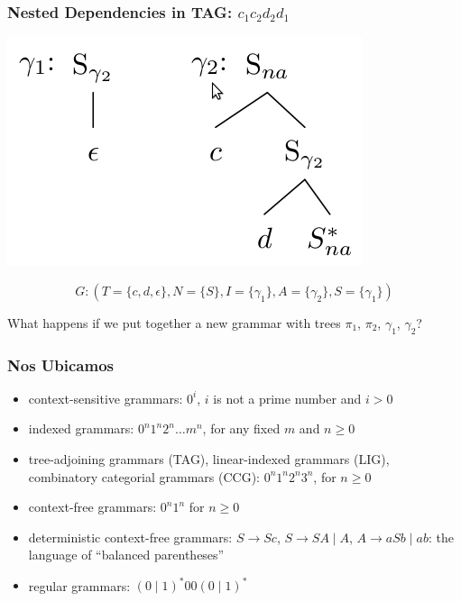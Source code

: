 \documentclass[compress,color=usenames]{beamer}
\begin{document}
\begin{frame}
\frametitle{Nested Dependencies in TAG: $c_1c_2d_2d_1$}


\begin{center}
\includegraphics[scale=.4]{pics/pic2-6.jpg}
\end{center}
$$G : (T = \{c, d, \epsilon\}, N = \{S \}, I = \{\gamma_1\}, A = \{\gamma_2\}, S = \{\gamma_1\})$$


What happens if we put together a new grammar with trees $\pi_1$, $\pi_2$, $\gamma_1$, $\gamma_2$?

\end{frame}

\begin{frame}
\frametitle{Nos Ubicamos}

\begin{itemize}

\item context-sensitive grammars: $0^i$, $i$ is not a prime number and $i > 0$


\item indexed grammars: $0^n1^n2^n \ldots m^n$, for any fixed $m$ and $n \geq 0$


\item tree-adjoining grammars (TAG), linear-indexed grammars (LIG),
combinatory categorial grammars (CCG): $0^n1^n2^n3^n$, for $n \geq 0$

\item context-free grammars: $0^n1^n$ for $n \geq 0$


\item deterministic context-free grammars: $S \rightarrow S c$, $S \rightarrow S A \mid A$,
$A \rightarrow a S b \mid ab$: the language of ``balanced parentheses''


\item regular grammars: $(0\mid 1)^*00(0\mid 1)^*$

\end{itemize}

\end{frame}
\end{document}
